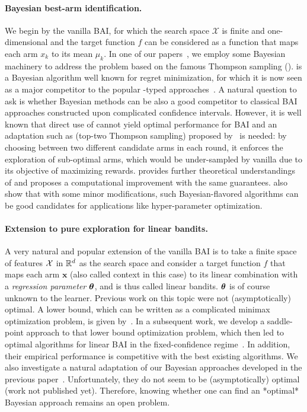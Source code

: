 \paragraph{Bayesian best-arm identification.} We begin by the vanilla BAI, for which the search space $\mathcal{X}$ is finite and one-dimensional and the target function $f$ can be considered as a function that maps each arm $x_k$ to its mean $\mu_k$. In one of our papers~\citep{shang2020t3c}, we employ some Bayesian machinery to address the problem based on the famous Thompson sampling (\TS). \TS is a Bayesian algorithm well known for regret minimization, for which it is now seen as a major competitor to the popular \UCB-typed approaches~\citep{auer2002ucb}. A natural question to ask is whether Bayesian methods can be also a good competitor to classical BAI approaches constructed upon complicated confidence intervals. However, it is well known that direct use of \TS cannot yield optimal performance for BAI and an adaptation such as \TTTS (top-two Thompson sampling) proposed by~\cite{russo2016ttts} is needed: by choosing between two different candidate arms in each round, it enforces the exploration of sub-optimal arms, which would be under-sampled by vanilla \TS due to its objective of maximizing rewards. \cite{shang2020t3c} provides further theoretical understandings of \TTTS and proposes a computational improvement \TCC with the same guarantees. \cite{shang2019dttts} also show that with some minor modifications, such Bayesian-flavored algorithms can be good candidates for applications like hyper-parameter optimization.

\paragraph{Extension to pure exploration for linear bandits.} A very natural and popular extension of the vanilla BAI is to take a finite space of features $\mathcal{X}$ in $\mathbb{R}^d$ as the search space and consider a target function $f$ that maps each arm $\mathbf{x}$ (also called context in this case) to its linear combination with a \emph{regression parameter} ${\boldsymbol \theta}$, and is thus called linear bandits. ${\boldsymbol \theta}$ is of course unknown to the learner. Previous work on this topic were not (asymptotically) optimal. A lower bound, which can be written as a complicated minimax optimization problem, is given by~\cite{garivier2016tracknstop}. In a subsequent work, we develop a saddle-point approach to that lower bound optimization problem, which then led to optimal algorithms for linear BAI in the fixed-confidence regime~\citep{degenne2020game}. In addition, their empirical performance is competitive with the best existing algorithms. We also investigate a natural adaptation of our Bayesian approaches developed in the previous paper~\citep{shang2020t3c}. Unfortunately, they do not seem to be (asymptotically) optimal (work not published yet). Therefore, knowing whether one can find an *optimal* Bayesian approach remains an open problem.

